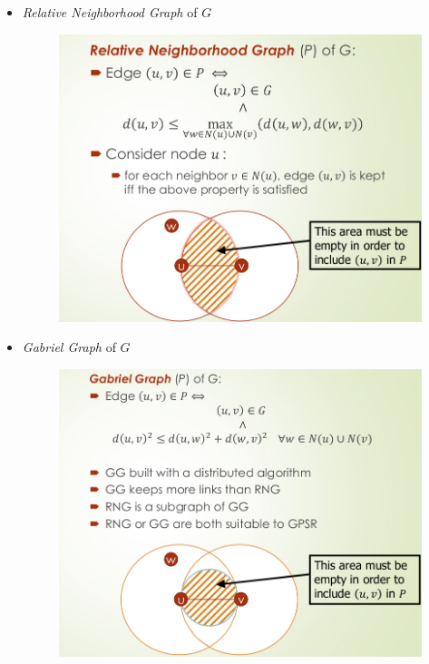 \begin{itemize}
   \item \textit{Relative Neighborhood Graph} of $G$
   \begin{figure}[htbp]
      \centering
      \includegraphics{images/wsn_planarization_1.png}
      \label{fig:wsn_planarization_1}
   \end{figure}
   \item \textit{Gabriel Graph} of $G$
   \begin{figure}[htbp]
      \centering
      \includegraphics{images/wsn_planarization_2.png}
      \label{fig:wsn_planarization_2}

\end{figure}
\end{itemize}
